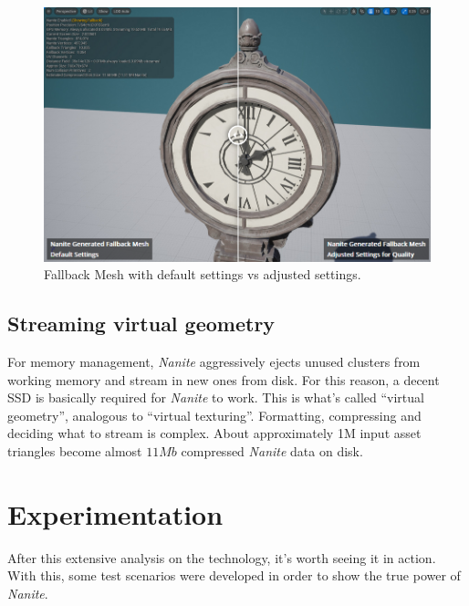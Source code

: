 \documentclass[10pt,journal,compsoc]{IEEEtran}
\begin{document}
\begin{figure}[H]
    \centering
    \includegraphics[scale=0.37]{img/fallback2.png}
    \caption{Fallback Mesh with default settings vs adjusted settings\cite{Unreal}.}
    \label{fig:Fallback2}
\end{figure}

\subsection{Streaming virtual geometry}

\par For memory management, \textit{Nanite} aggressively ejects unused clusters from working memory and stream in new ones from disk. For this reason, a decent SSD is basically required for \textit{Nanite} to work. This is what's called “virtual geometry”, analogous to “virtual texturing”. Formatting, compressing and deciding what to stream is complex. About approximately 1M input asset triangles become almost $11 Mb$ compressed \textit{Nanite} data on disk\cite{karies_stubbe_wihlidal_2}.


\section{Experimentation}\label{sec:5}

\par After this extensive analysis on the technology, it's worth seeing it in action. With this, some test scenarios were developed in order to show the true power of \textit{Nanite}.
\end{document}
